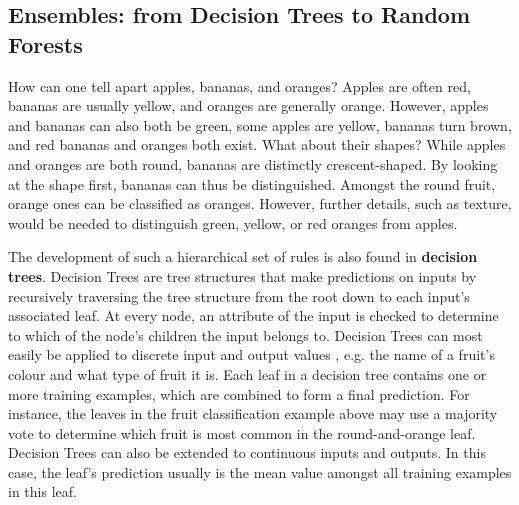 \subsection{Ensembles: from Decision Trees to Random Forests} \label{txt:ensembles-decision-tree-random-forest}

How can one tell apart apples, bananas, and oranges? Apples are often red, bananas are usually yellow, and oranges are generally orange. However, apples and bananas can also both be green, some apples are yellow, bananas turn brown, and red bananas and oranges both exist. What about their shapes? While apples and oranges are both round, bananas are distinctly crescent-shaped. By looking at the shape first, bananas can thus be distinguished. Amongst the round fruit, orange ones can be classified as oranges. However, further details, such as texture, would be needed to distinguish green, yellow, or red oranges from apples.

\newpar The development of such a hierarchical set of rules is also found in \textbf{decision trees}. Decision Trees are tree structures that make predictions on inputs by recursively traversing the tree structure from the root down to each input's associated leaf. At every node, an attribute of the input is checked to determine to which of the node's children the input belongs to. Decision Trees can most easily be applied to discrete input and output values \cite{machine-learning-1997}, e.g. the name of a fruit's colour and what type of fruit it is. Each leaf in a decision tree contains one or more training examples, which are combined to form a final prediction. For instance, the leaves in the fruit classification example above may use a majority vote to determine which fruit is most common in the round-and-orange leaf. Decision Trees can also be extended to continuous inputs and outputs. In this case, the leaf's prediction usually is the mean value amongst all training examples in this leaf.

